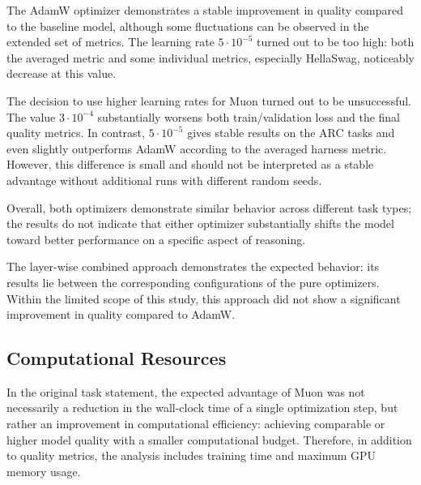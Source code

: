 \documentclass{article}
\begin{document}
The AdamW optimizer demonstrates a stable improvement in quality compared to the baseline model, although some fluctuations can be observed in the extended set of metrics. The learning rate $5 \cdot 10^{-5}$ turned out to be too high: both the averaged metric and some individual metrics, especially HellaSwag, noticeably decrease at this value.

The decision to use higher learning rates for Muon turned out to be unsuccessful. The value $3 \cdot 10^{-4}$ substantially worsens both train/validation loss and the final quality metrics. In contrast, $5 \cdot 10^{-5}$ gives stable results on the ARC tasks and even slightly outperforms AdamW according to the averaged harness metric. However, this difference is small and should not be interpreted as a stable advantage without additional runs with different random seeds.

Overall, both optimizers demonstrate similar behavior across different task types; the results do not indicate that either optimizer substantially shifts the model toward better performance on a specific aspect of reasoning.

The layer-wise combined approach demonstrates the expected behavior: its results lie between the corresponding configurations of the pure optimizers. Within the limited scope of this study, this approach did not show a significant improvement in quality compared to AdamW.

\subsection{Computational Resources}

In the original task statement, the expected advantage of Muon was not necessarily a reduction in the wall-clock time of a single optimization step, but rather an improvement in computational efficiency: achieving comparable or higher model quality with a smaller computational budget. Therefore, in addition to quality metrics, the analysis includes training time and maximum GPU memory usage.
\end{document}
